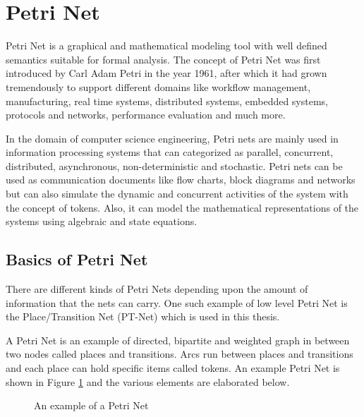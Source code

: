 \section{Petri Net}
Petri Net is a graphical and mathematical modeling tool with well defined semantics suitable for formal analysis. The concept of Petri Net was first introduced by Carl Adam Petri in the year 1961, after which it had grown tremendously to support different domains like workflow management, manufacturing, real time systems, distributed systems, embedded systems, protocols and networks, performance evaluation and much more.
 
In the domain of computer science engineering, Petri nets are mainly used in information processing systems that can categorized as parallel, concurrent, distributed, asynchronous, non-deterministic and stochastic. Petri nets can be used as communication documents like flow charts, block diagrams and networks but can also simulate the dynamic and concurrent activities of the system with the concept of tokens. Also, it can model the mathematical representations of the systems using algebraic and state equations. 

\subsection{Basics of Petri Net}
There are different kinds of Petri Nets depending upon the amount of information that the nets can carry. One such example of low level Petri Net is the Place/Transition Net (PT-Net) which is used in this thesis.

A Petri Net is an example of directed, bipartite and weighted graph in between two nodes called places and transitions. Arcs run between places and transitions and each place can hold specific items called tokens. An example Petri Net is shown in Figure \ref{fig:petrinet_example} and the various elements are elaborated below.

\begin{figure}[htb!]
\centering
{}
\caption{An example of a Petri Net}
\label{fig:petrinet_example}
\end{figure}

